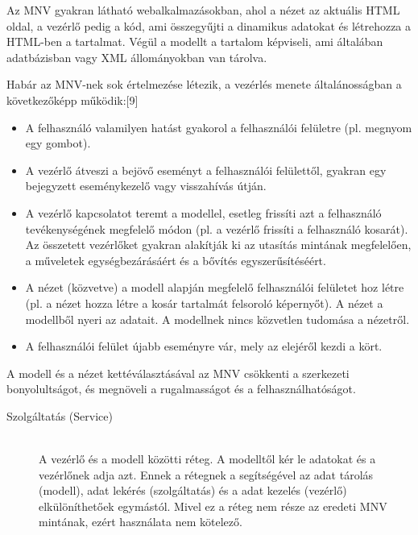\documentclass[margin=0px]{article}
\begin{document}
Az MNV gyakran látható webalkalmazásokban, ahol a nézet az aktuális HTML oldal, a vezérlő pedig a kód, ami összegyűjti a dinamikus adatokat és létrehozza a HTML-ben a tartalmat. Végül a modellt a tartalom képviseli, ami általában adatbázisban vagy XML állományokban van tárolva.

Habár az MNV-nek sok értelmezése létezik, a vezérlés menete általánosságban a következőképp működik:[9]
\begin{itemize}
    \item A felhasználó valamilyen hatást gyakorol a felhasználói felületre (pl. megnyom egy gombot).
    \item A vezérlő átveszi a bejövő eseményt a felhasználói felülettől, gyakran egy bejegyzett eseménykezelő vagy visszahívás útján.
    \item A vezérlő kapcsolatot teremt a modellel, esetleg frissíti azt a felhasználó tevékenységének megfelelő módon (pl. a vezérlő frissíti a felhasználó kosarát). Az összetett vezérlőket gyakran alakítják ki az utasítás mintának megfelelően, a műveletek egységbezárásáért és a bővítés egyszerűsítéséért.
    \item A nézet (közvetve) a modell alapján megfelelő felhasználói felületet hoz létre (pl. a nézet hozza létre a kosár tartalmát felsoroló képernyőt). A nézet a modellből nyeri az adatait. A modellnek nincs közvetlen tudomása a nézetről.
    \item A felhasználói felület újabb eseményre vár, mely az elejéről kezdi a kört.
\end{itemize}

A modell és a nézet kettéválasztásával az MNV csökkenti a szerkezeti bonyolultságot, és megnöveli a rugalmasságot és a felhasználhatóságot.

\begin{description}
    \item[Szolgáltatás (Service)] \hfill \\
        A vezérlő és a modell közötti réteg. A modelltől kér le adatokat és a vezérlőnek adja azt. Ennek a rétegnek a segítségével az adat tárolás (modell), adat lekérés (szolgáltatás) és a adat kezelés (vezérlő) elkülöníthetőek egymástól. Mivel ez a réteg nem része az eredeti MNV mintának, ezért használata nem kötelező.
\end{description}
\end{document}
